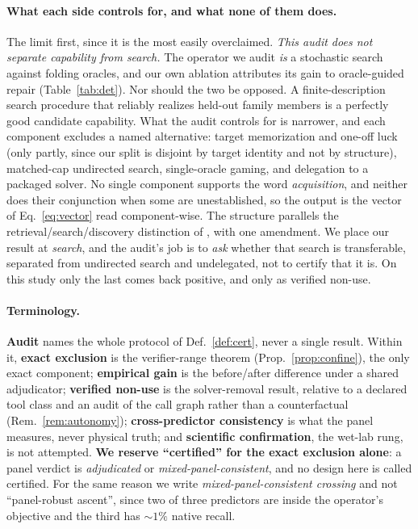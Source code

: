 \documentclass[11pt]{article}
\begin{document}
\paragraph{What each side controls for, and what none of them does.} The limit first, since it is the most
easily overclaimed. \emph{This audit does not separate capability from search.} The operator we audit
\emph{is} a stochastic search against folding oracles, and our own ablation attributes its gain to
oracle-guided repair (Table~\ref{tab:det}). Nor should the two be opposed. A finite-description search
procedure that reliably realizes held-out family members is a perfectly good candidate capability. What the
audit controls for is narrower, and each component excludes a named alternative: target memorization and
one-off luck (only partly, since our split is disjoint by target identity and not by structure), matched-cap
undirected search, single-oracle gaming, and delegation to a packaged solver. No single component supports the
word \emph{acquisition}, and neither does their conjunction when some are unestablished, so the output is the
vector of Eq.~\eqref{eq:vector} read component-wise. The structure parallels the retrieval/search/discovery
distinction of \citet{selfrevising}, with one amendment. We place our result at \emph{search}, and the audit's
job is to \emph{ask} whether that search is transferable, separated from undirected search and undelegated,
not to certify that it is. On this study only the last comes back positive, and only as verified non-use.

\paragraph{Terminology.} \textbf{Audit} names the whole protocol of Def.~\ref{def:cert}, never a single result.
Within it, \textbf{exact exclusion} is the verifier-range theorem (Prop.~\ref{prop:confine}), the only exact
component; \textbf{empirical gain} is the before/after difference under a shared adjudicator; \textbf{verified
non-use} is the solver-removal result, relative to a declared tool class and an audit of the call graph rather
than a counterfactual (Rem.~\ref{rem:autonomy}); \textbf{cross-predictor consistency} is what the panel
measures, never physical truth; and \textbf{scientific confirmation}, the wet-lab rung, is not attempted.
\textbf{We reserve ``certified'' for the exact exclusion alone}: a panel verdict is \emph{adjudicated} or
\emph{mixed-panel-consistent}, and no design here is called certified. For the same reason we write
\emph{mixed-panel-consistent crossing} and not ``panel-robust ascent'', since two of three predictors are inside
the operator's objective and the third has $\sim\!1\%$ native recall.
\end{document}
